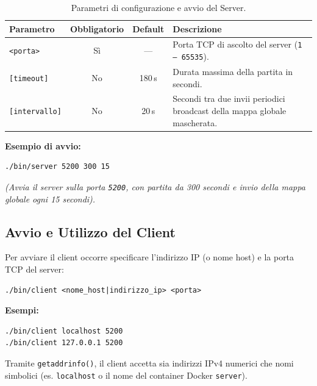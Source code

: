 \documentclass[11pt,a4paper]{article}
\begin{document}
\begin{table}[htbp]
\centering
\begin{tabularx}{\textwidth}{l c c X}
\toprule
\textbf{Parametro} & \textbf{Obbligatorio} & \textbf{Default} & \textbf{Descrizione} \\
\midrule
\texttt{<porta>} & Sì & --- & Porta TCP di ascolto del server (\texttt{1 -- 65535}). \\
\texttt{[timeout]} & No & 180\,s & Durata massima della partita in secondi. \\
\texttt{[intervallo]} & No & 20\,s & Secondi tra due invii periodici broadcast della mappa globale mascherata. \\
\bottomrule
\end{tabularx}
\caption{Parametri di configurazione e avvio del Server.}
\label{tab:server-params}
\end{table}

\textbf{Esempio di avvio:}
\begin{lstlisting}[style=bashstyle]
./bin/server 5200 300 15
\end{lstlisting}
\textit{(Avvia il server sulla porta \texttt{5200}, con partita da 300 secondi e invio della mappa globale ogni 15 secondi).}

\clearpage

\subsection{Avvio e Utilizzo del Client}

Per avviare il client occorre specificare l'indirizzo IP (o nome host) e la porta TCP del server:
\begin{lstlisting}[style=bashstyle]
./bin/client <nome_host|indirizzo_ip> <porta>
\end{lstlisting}

\textbf{Esempi:}
\begin{lstlisting}[style=bashstyle]
./bin/client localhost 5200
./bin/client 127.0.0.1 5200
\end{lstlisting}

Tramite \texttt{getaddrinfo()}, il client accetta sia indirizzi IPv4 numerici che nomi simbolici (es. \texttt{localhost} o il nome del container Docker \texttt{server}).
\end{document}
